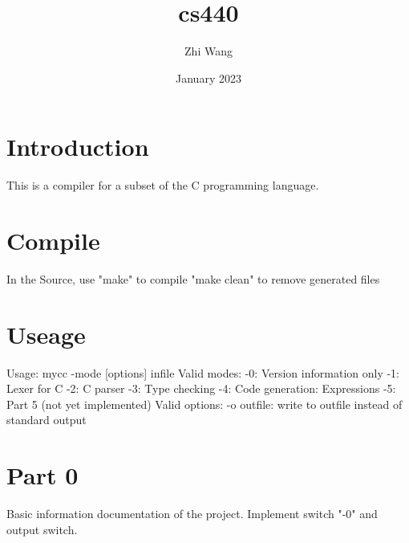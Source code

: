 \documentclass{article}
\title{cs440}
\author{Zhi Wang}
\date{January 2023}
\begin{document}
\maketitle

\section{Introduction}
This is a compiler for a subset of the C programming language.

\section{Compile}
In the Source, use
"make" to compile
"make clean" to remove generated files

\section{Useage}
Usage:
	mycc -mode [options] infile 
Valid modes:
	-0: Version information only
	-1: Lexer for C
	-2: C parser
	-3: Type checking
	-4: Code generation: Expressions
	-5: Part 5 (not yet implemented)
Valid options:
	-o outfile: write to outfile instead of standard output


\section{Part 0}
Basic information documentation of the project.
Implement switch "-0" and output switch.
\end{document}
